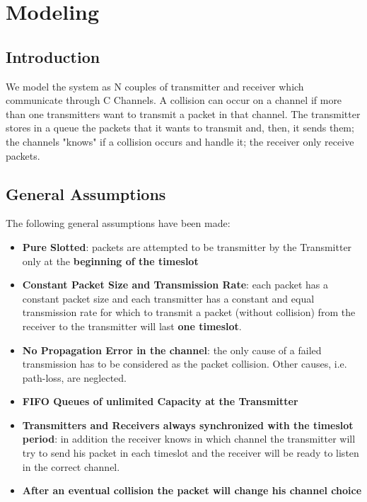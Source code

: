\section{Modeling}
\subsection{Introduction}
We model the system as N couples of transmitter and receiver which communicate through C Channels. A collision can occur on a channel if more than one transmitters want to transmit a packet in that channel. The transmitter stores in a queue the packets that it wants to transmit and, then, it sends them; the channels "knows" if a collision occurs and handle it; the receiver only receive packets.  
\subsection{General Assumptions}
The following general assumptions have been made:
\begin{itemize}
	\item \textbf{Pure Slotted}: packets are attempted to be transmitter by the Transmitter only at the \textbf{beginning of the timeslot}
	\item \textbf{Constant Packet Size and Transmission Rate}: each packet has a constant packet size and each transmitter has a constant and equal transmission rate for which to transmit a packet (without collision) from the receiver to the transmitter will last \textbf{one timeslot}.
	\item \textbf{No Propagation Error in the channel}: the only cause of a failed transmission has to be considered as the packet collision. Other causes, i.e. path-loss, are neglected. 
	\item \textbf{FIFO Queues of unlimited Capacity at the Transmitter} 
	\item \textbf{Transmitters and Receivers always synchronized with the timeslot period}: in addition the receiver knows in which channel the transmitter will try to send his packet in each timeslot and the receiver will be ready to listen in the correct channel.
	\item \textbf{After an eventual collision the packet will change his channel choice}
\end{itemize}


